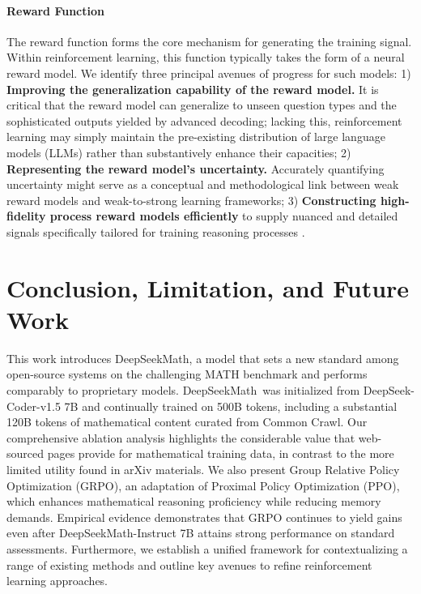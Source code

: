 \paragraph{Reward Function} The reward function forms the core mechanism for generating the training signal. Within reinforcement learning, this function typically takes the form of a neural reward model. We identify three principal avenues of progress for such models: 1) \textbf{Improving the generalization capability of the reward model.} It is critical that the reward model can generalize to unseen question types and the sophisticated outputs yielded by advanced decoding; lacking this, reinforcement learning may simply maintain the pre-existing distribution of large language models (LLMs) rather than substantively enhance their capacities; 2) \textbf{Representing the reward model's uncertainty.} Accurately quantifying uncertainty might serve as a conceptual and methodological link between weak reward models and weak-to-strong learning frameworks; 3) \textbf{Constructing high-fidelity process reward models efficiently} to supply nuanced and detailed signals specifically tailored for training reasoning processes \citep{lightman2023let,wang2023math}.

\section{Conclusion, Limitation, and Future Work}

This work introduces DeepSeekMath, a model that sets a new standard among open-source systems on the challenging MATH benchmark and performs comparably to proprietary models. DeepSeekMath~was initialized from DeepSeek-Coder-v1.5 7B and continually trained on 500B tokens, including a substantial 120B tokens of mathematical content curated from Common Crawl. Our comprehensive ablation analysis highlights the considerable value that web-sourced pages provide for mathematical training data, in contrast to the more limited utility found in arXiv materials. We also present Group Relative Policy Optimization (GRPO), an adaptation of Proximal Policy Optimization (PPO), which enhances mathematical reasoning proficiency while reducing memory demands. Empirical evidence demonstrates that GRPO continues to yield gains even after DeepSeekMath-Instruct 7B attains strong performance on standard assessments. Furthermore, we establish a unified framework for contextualizing a range of existing methods and outline key avenues to refine reinforcement learning approaches.

